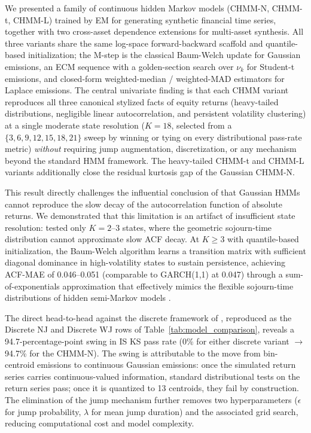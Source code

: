 We presented a family of continuous hidden Markov models (CHMM-N, CHMM-t, CHMM-L) trained by EM for generating synthetic financial time series, together with two cross-asset dependence extensions for multi-asset synthesis.
All three variants share the same log-space forward-backward scaffold and quantile-based initialization; the M-step is the classical Baum-Welch update for Gaussian emissions, an ECM sequence with a golden-section search over $\nu_k$ for Student-t emissions, and closed-form weighted-median / weighted-MAD estimators for Laplace emissions.
The central univariate finding is that each CHMM variant reproduces all three canonical stylized facts of equity returns (heavy-tailed distributions, negligible linear autocorrelation, and persistent volatility clustering) at a single moderate state resolution ($K = 18$, selected from a $\{3, 6, 9, 12, 15, 18, 21\}$ sweep by winning or tying on every distributional pass-rate metric) \emph{without} requiring jump augmentation, discretization, or any mechanism beyond the standard HMM framework.
The heavy-tailed CHMM-t and CHMM-L variants additionally close the residual kurtosis gap of the Gaussian CHMM-N.

This result directly challenges the influential conclusion of \citet{ryden1998stylized} that Gaussian HMMs cannot reproduce the slow decay of the autocorrelation function of absolute returns.
We demonstrated that this limitation is an artifact of insufficient state resolution: \citet{ryden1998stylized} tested only $K = 2$--$3$ states, where the geometric sojourn-time distribution cannot approximate slow ACF decay.
At $K \geq 3$ with quantile-based initialization, the Baum-Welch algorithm learns a transition matrix with sufficient diagonal dominance in high-volatility states to sustain persistence, achieving ACF-MAE of 0.046--0.051 (comparable to GARCH(1,1) at 0.047) through a sum-of-exponentials approximation that effectively mimics the flexible sojourn-time distributions of hidden semi-Markov models \cite{bulla2006stylized}.

The direct head-to-head against the discrete framework of \citet{alswaidan2026hybrid}, reproduced as the Discrete NJ and Discrete WJ rows of Table~\ref{tab:model_comparison}, reveals a 94.7-percentage-point swing in IS KS pass rate (0\% for either discrete variant $\to$ 94.7\% for the CHMM-N).
The swing is attributable to the move from bin-centroid emissions to continuous Gaussian emissions: once the simulated return series carries continuous-valued information, standard distributional tests on the return series pass; once it is quantized to 13 centroids, they fail by construction.
The elimination of the jump mechanism further removes two hyperparameters ($\epsilon$ for jump probability, $\lambda$ for mean jump duration) and the associated grid search, reducing computational cost and model complexity.

